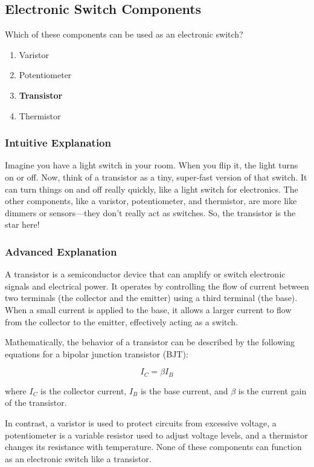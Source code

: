 \subsection{Electronic Switch Components}
\label{T6B03}

\begin{tcolorbox}[colback=gray!10!white,colframe=black!75!black,title=T6B03]
Which of these components can be used as an electronic switch?
\begin{enumerate}[label=\Alph*]
    \item Varistor
    \item Potentiometer
    \item \textbf{Transistor}
    \item Thermistor
\end{enumerate}
\end{tcolorbox}

\subsubsection{Intuitive Explanation}
Imagine you have a light switch in your room. When you flip it, the light turns on or off. Now, think of a transistor as a tiny, super-fast version of that switch. It can turn things on and off really quickly, like a light switch for electronics. The other components, like a varistor, potentiometer, and thermistor, are more like dimmers or sensors—they don’t really act as switches. So, the transistor is the star here!

\subsubsection{Advanced Explanation}
A transistor is a semiconductor device that can amplify or switch electronic signals and electrical power. It operates by controlling the flow of current between two terminals (the collector and the emitter) using a third terminal (the base). When a small current is applied to the base, it allows a larger current to flow from the collector to the emitter, effectively acting as a switch.

Mathematically, the behavior of a transistor can be described by the following equations for a bipolar junction transistor (BJT):

\[
I_C = \beta I_B
\]

where \( I_C \) is the collector current, \( I_B \) is the base current, and \( \beta \) is the current gain of the transistor.

In contrast, a varistor is used to protect circuits from excessive voltage, a potentiometer is a variable resistor used to adjust voltage levels, and a thermistor changes its resistance with temperature. None of these components can function as an electronic switch like a transistor.

